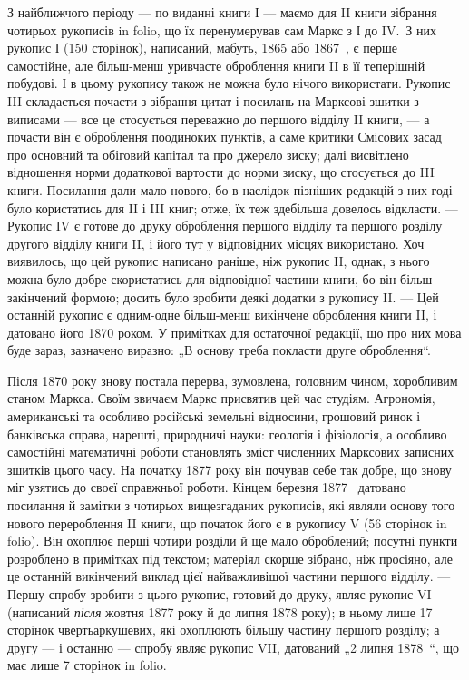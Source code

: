 З найближчого періоду — по виданні книги І — маємо для II книги зібрання
чотирьох рукописів in folio, що їх перенумерував сам Маркс з
І до IV.~З них рукопис І (150 сторінок), написаний, мабуть, 1865 або
1867~, є перше самостійне, але більш-менш уривчасте оброблення
книги II в її теперішній побудові. І в цьому рукопису також не можна
було нічого використати. Рукопис III складається почасти з зібрання
цитат і посилань на Марксові зшитки з виписами — все це стосується переважно
до першого відділу II книги, — а почасти він є оброблення поодиноких
пунктів, а саме критики Смісових засад про основний та обіговий
капітал та про джерело зиску; далі висвітлено відношення норми
додаткової вартости до норми зиску, що стосується до III книги. Посилання
дали мало нового, бо в наслідок пізніших редакцій з них годі
було користатись для II і III книг; отже, їх теж здебільша довелось відкласти.
— Рукопис IV є готове до друку оброблення першого відділу та
першого розділу другого відділу книги II, і його тут у відповідних місцях
використано. Хоч виявилось, що цей рукопис написано раніше, ніж
рукопис II, однак, з нього можна було добре скористатись для відповідної
частини книги, бо він більш закінчений формою; досить було
зробити деякі додатки з рукопису II. — Цей останній рукопис є одним-одне
більш-менш викінчене оброблення книги II, і датовано його
1870 роком. У примітках для остаточної редакції, що про них мова
буде зараз, зазначено виразно: „В основу треба покласти друге оброблення“.

Після 1870 року знову постала перерва, зумовлена, головним чином,
хоробливим станом Маркса. Своїм звичаєм Маркс присвятив цей час
студіям. Агрономія, американські та особливо російські земельні відносини,
грошовий ринок і банківська справа, нарешті, природничі науки:
геологія і фізіологія, а особливо самостійні математичні роботи становлять
зміст численних Марксових записних зшитків цього часу. На початку
1877 року він почував себе так добре, що знову міг узятись
до своєї справжньої роботи. Кінцем березня 1877~ датовано посилання
й замітки з чотирьох вищезгаданих рукописів, які являли основу
того нового перероблення II книги, що початок його є в рукопису V
(56 сторінок in folio). Він охоплює перші чотири розділи й ще мало
оброблений; посутні пункти розроблено в примітках під текстом; матеріял
скорше зібрано, ніж просіяно, але це останній викінчений виклад цієї найважливішої
частини першого відділу. — Першу спробу зробити з цього
рукопис, готовий до друку, являє рукопис VI (написаний \emph{після} жовтня
1877 року й до липня 1878 року); в ньому лише 17 сторінок чвертьаркушевих,
які охоплюють більшу частину першого розділу; а другу — і
останню — спробу являє рукопис VII, датований „2 липня 1878~“, що
має лише 7 сторінок in folio.

